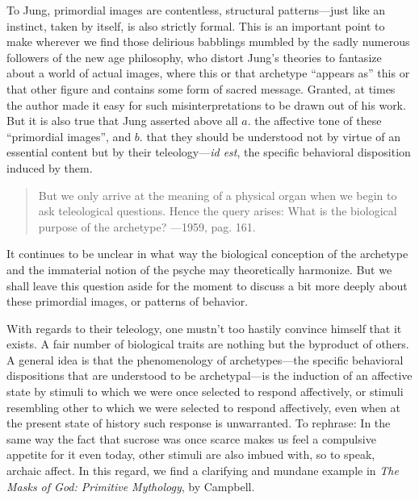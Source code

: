 \documentclass[a4paper]{article}
\begin{document}
To Jung, primordial images are contentless, structural patterns—just like an
instinct, taken by itself, is also strictly formal. This is an important
point to make wherever we find those delirious babblings mumbled by the
sadly numerous followers of the new age philosophy, who distort Jung's
theories to fantasize about a world of actual images, where this or that
archetype “appears as” this or that other figure and contains some form of
sacred message. Granted, at times the author made it easy for such
misinterpretations to be drawn out of his work. But it is also true that
Jung asserted above all $a.$ the affective tone of these “primordial images”,
and $b.$ that they should be understood not by virtue of an essential content
but by their teleology—\textit{id est}, the specific behavioral disposition induced
by them. 

\begin{quote}
But we only arrive at the meaning of a physical organ when we begin to ask
teleological questions. Hence the query arises: What is the biological
purpose of the archetype? —1959, pag. 161. 
\end{quote}


It continues to be unclear in what way the biological conception
of the archetype and the immaterial notion of the psyche may theoretically
harmonize. But we shall leave this question aside for the moment to discuss
a bit more deeply about these primordial images, or patterns of behavior.

With regards to their teleology, one mustn't too hastily convince himself
that it exists. A fair number of biological traits are nothing but the
byproduct of others. A general idea is that the phenomenology of
archetypes---the specific behavioral dispositions that are understood to be
archetypal---is the induction of an affective state by stimuli to which we
were once selected to respond affectively, or
stimuli resembling other to which we were selected to respond affectively,
even when at the present state of history such response is unwarranted.
To rephrase: In the same way the fact that sucrose was once scarce makes us feel a
compulsive appetite for it even today, other stimuli are also imbued with,
so to speak, archaic affect. In this regard, we find a clarifying and
mundane example in \textit{The Masks of God: Primitive Mythology}, by
Campbell. 
\end{document}
